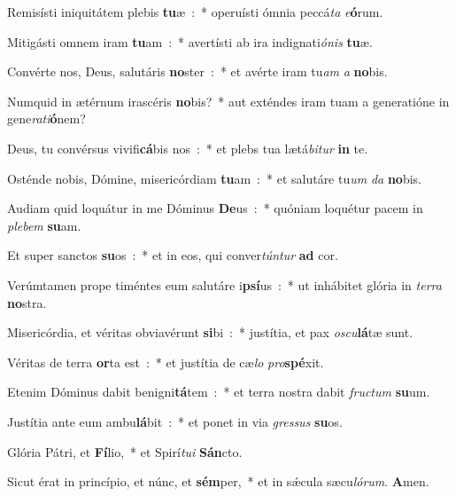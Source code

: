 \item Remisísti iniquitátem plebis \textbf{tu}æ~:~* operuísti ómnia peccá\emph{ta} \emph{e}\textbf{ó}rum.
\item Mitigásti omnem iram \textbf{tu}am~:~* avertísti ab ira indignati\emph{ó}\emph{nis} \textbf{tu}æ.
\item Convérte nos, Deus, salutáris \textbf{no}ster~:~* et avérte iram tu\emph{am} \emph{a} \textbf{no}bis.
\item Numquid in ætérnum irascéris \textbf{no}bis?~* aut exténdes iram tuam a generatióne in gene\emph{ra}\emph{ti}\textbf{ó}nem?
\item Deus, tu convérsus vivifi\textbf{cá}bis nos~:~* et plebs tua lætá\emph{bi}\emph{tur} \textbf{in} te.
\item Osténde nobis, Dómine, misericórdiam \textbf{tu}am~:~* et salutáre tu\emph{um} \emph{da} \textbf{no}bis.
\item Audiam quid loquátur in me Dóminus \textbf{De}us~:~* quóniam loquétur pacem in \emph{ple}\emph{bem} \textbf{su}am.
\item Et super sanctos \textbf{su}os~:~* et in eos, qui conver\emph{tún}\emph{tur} \textbf{ad} cor.
\item Verúmtamen prope timéntes eum salutáre i\textbf{psí}us~:~* ut inhábitet glória in \emph{ter}\emph{ra} \textbf{no}stra.
\item Misericórdia, et véritas obviavérunt \textbf{si}bi~:~* justítia, et pax \emph{o}\emph{scu}\textbf{lá}tæ sunt.
\item Véritas de terra \textbf{or}ta est~:~* et justítia de cæ\emph{lo} \emph{pro}\textbf{spé}xit.
\item Etenim Dóminus dabit benigni\textbf{tá}tem~:~* et terra nostra dabit \emph{fru}\emph{ctum} \textbf{su}um.
\item Justítia ante eum ambu\textbf{lá}bit~:~* et ponet in via \emph{gres}\emph{sus} \textbf{su}os.
\item Glória Pátri, et \textbf{Fí}lio,~* et Spirí\emph{tu}\emph{i} \textbf{Sán}cto.
\item Sicut érat in princípio, et núnc, et \textbf{sém}per,~* et in sǽcula sæcu\emph{ló}\emph{rum}. \textbf{A}men.